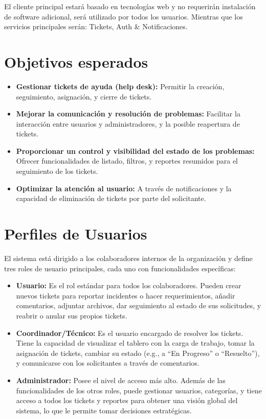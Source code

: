 \documentclass[12pt,a4paper]{article}
\begin{document}
El cliente principal estará basado en tecnologías web y no requerirán instalación de software adicional, será utilizado por todos los usuarios. Mientras que los servicios principales serán: Tickets, Auth \& Notificaciones.

\section{Objetivos esperados}

\begin{itemize}
    \item \textbf{Gestionar tickets de ayuda (help desk):} Permitir la creación, seguimiento, asignación, y cierre de tickets.
    \item \textbf{Mejorar la comunicación y resolución de problemas:} Facilitar la interacción entre usuarios y administradores, y la posible reapertura de tickets.
    \item \textbf{Proporcionar un control y visibilidad del estado de los problemas:} Ofrecer funcionalidades de listado, filtros, y reportes resumidos para el seguimiento de los tickets.
    \item \textbf{Optimizar la atención al usuario:} A través de notificaciones y la capacidad de eliminación de tickets por parte del solicitante.
\end{itemize}

\section{Perfiles de Usuarios}

El sistema está dirigido a los colaboradores internos de la organización y define tres roles de usuario principales, cada uno con funcionalidades específicas:

\begin{itemize}
    \item \textbf{Usuario:} Es el rol estándar para todos los colaboradores. Pueden crear nuevos tickets para reportar incidentes o hacer requerimientos, añadir comentarios, adjuntar archivos, dar seguimiento al estado de sus solicitudes, y reabrir o anular sus propios tickets.
    
    \item \textbf{Coordinador/Técnico:} Es el usuario encargado de resolver los tickets. Tiene la capacidad de visualizar el tablero con la carga de trabajo, tomar la asignación de tickets, cambiar su estado (e.g., a ``En Progreso'' o ``Resuelto''), y comunicarse con los solicitantes a través de comentarios.
    
    \item \textbf{Administrador:} Posee el nivel de acceso más alto. Además de las funcionalidades de los otros roles, puede gestionar usuarios, categorías, y tiene acceso a todos los tickets y reportes para obtener una visión global del sistema, lo que le permite tomar decisiones estratégicas.
\end{itemize}
\end{document}
